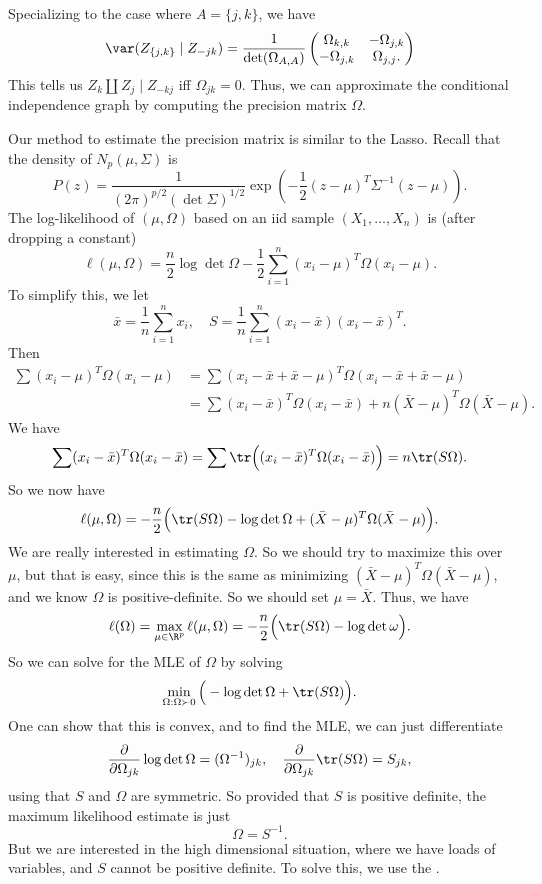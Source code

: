 \documentclass[a4paper]{article}
\begin{document}
Specializing to the case where $A = \{j, k\}$, we have
\[
  \var(Z_{\{j, k\}} \mid Z_{-jk}) = \frac{1}{\det (\Omega_{A, A})}
  \begin{pmatrix}
    \Omega_{k, k} & -\Omega_{j, k}\\
    -\Omega_{j, k} & \Omega_{j, j}.
  \end{pmatrix}
\]
This tells us $Z_k \amalg Z_j \mid Z_{-kj}$ iff $\Omega_{j k} = 0$. Thus, we can approximate the conditional independence graph by computing the precision matrix $\Omega$.

Our method to estimate the precision matrix is similar to the Lasso. Recall that the density of $N_p(\mu, \Sigma)$ is
\[
  P(z) = \frac{1}{(2\pi)^{p/2} (\det \Sigma)^{1/2}} \exp \left(-\frac{1}{2} (z - \mu)^T \Sigma^{-1} (z - \mu)\right).
\]
The log-likelihood of $(\mu, \Omega)$ based on an iid sample $(X_1, \ldots, X_n)$ is (after dropping a constant)
\[
  \ell(\mu, \Omega) = \frac{n}{2} \log \det \Omega - \frac{1}{2} \sum_{i = 1}^n (x_i - \mu)^T \Omega (x_i - \mu).
\]
To simplify this, we let
\[
  \bar{x} = \frac{1}{n} \sum_{i = 1}^n x_i,\quad S = \frac{1}{n} \sum_{i = 1}^n (x_i - \bar{x}) (x_i - \bar{x})^T.
\]
Then
\begin{align*}
  \sum (x_i - \mu)^T \Omega (x_i -\mu) &= \sum (x_i - \bar{x} + \bar{x} - \mu)^T \Omega (x_i - \bar{x} + \bar{x} - \mu) \\
  &= \sum (x_i - \bar{x})^T \Omega (x_i - \bar{x}) + n (\bar{X} - \mu)^T \Omega (\bar{X} - \mu).
\end{align*}
We have
\[
  \sum (x_i - \bar{x})^T \Omega (x_i - \bar{x}) = \sum \tr \Big((x_i - \bar{x})^T \Omega (x_i - \bar{x})\Big) = n \tr (S\Omega).
\]
So we now have
\[
  \ell(\mu, \Omega) = -\frac{n}{2} \Big(\tr (S\Omega) - \log \det \Omega + (\bar{X} - \mu)^T \Omega (\bar{X} - \mu)\Big).
\]
We are really interested in estimating $\Omega$. So we should try to maximize this over $\mu$, but that is easy, since this is the same as minimizing $(\bar{X} - \mu)^T \Omega (\bar{X} - \mu)$, and we know $\Omega$ is positive-definite. So we should set $\mu = \bar{X}$. Thus, we have
\[
  \ell(\Omega) = \max_{\mu \in \R^p} \ell(\mu, \Omega) = -\frac{n}{2} \Big(\tr (S\Omega) - \log \det \omega\Big).
\]
So we can solve for the MLE of $\Omega$ by solving
\[
  \min_{\Omega: \Omega \succ 0} \Big(- \log \det \Omega + \tr (S \Omega)\Big).
\]
One can show that this is convex, and to find the MLE, we can just differentiate
\[
  \frac{\partial}{\partial \Omega_{jk}} \log \det \Omega = (\Omega^{-1})_{jk},\quad \frac{\partial}{\partial \Omega_{jk}} \tr (S\Omega) = S_{jk},
\]
using that $S$ and $\Omega$ are symmetric. So provided that $S$ is positive definite, the maximum likelihood estimate is just
\[
  \Omega = S^{-1}.
\]
But we are interested in the high dimensional situation, where we have loads of variables, and $S$ cannot be positive definite. To solve this, we use the .
\end{document}
